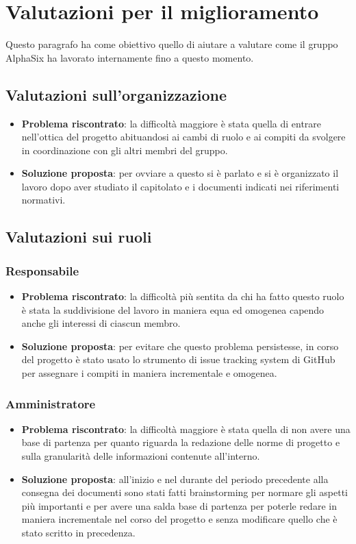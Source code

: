 \newpage
\section{Valutazioni per il miglioramento}

	Questo paragrafo ha come obiettivo quello di aiutare a valutare come il gruppo AlphaSix ha lavorato internamente fino a questo momento. 

	\subsection{Valutazioni sull'organizzazione}
		\begin{itemize}
			\item \textbf{Problema riscontrato}: la difficoltà maggiore è stata quella di entrare nell'ottica del progetto abituandosi ai cambi di ruolo e ai compiti da svolgere in coordinazione con gli altri membri del gruppo.
			\item \textbf{Soluzione proposta}: per ovviare a questo si è parlato e si è organizzato il lavoro dopo aver studiato il capitolato e i documenti indicati nei riferimenti normativi.
		\end{itemize}
	
	\subsection{Valutazioni sui ruoli}
	
		\subsubsection{Responsabile}
			\begin{itemize}
				\item \textbf{Problema riscontrato}: la difficoltà più sentita da chi ha fatto questo ruolo è stata la suddivisione del lavoro in maniera equa ed omogenea capendo anche gli interessi di ciascun membro.
				\item \textbf{Soluzione proposta}: per evitare che questo problema persistesse, in corso del progetto è stato usato lo strumento di issue tracking system di GitHub per assegnare i compiti in maniera incrementale e omogenea.
			\end{itemize}

		\subsubsection{Amministratore}
			\begin{itemize}
				\item \textbf{Problema riscontrato}: la difficoltà maggiore è stata quella di non avere una base di partenza per quanto riguarda la redazione delle norme di progetto e sulla granularità delle informazioni contenute all'interno.
				\item \textbf{Soluzione proposta}: all'inizio e nel durante del periodo precedente alla consegna dei documenti sono stati fatti brainstorming per normare gli aspetti più importanti e per avere una salda base di partenza per poterle redare in maniera incrementale nel corso del progetto e senza modificare quello che è stato scritto in precedenza.
			\end{itemize}

